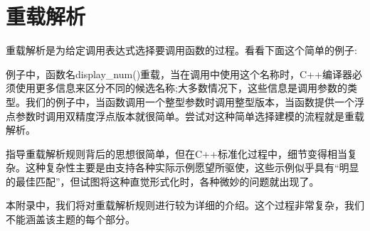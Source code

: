 \chapter{重载解析}
重载解析是为给定调用表达式选择要调用函数的过程。看看下面这个简单的例子:


例子中，函数名display\_num()重载，当在调用中使用这个名称时，C++编译器必须使用更多信息来区分不同的候选名称;大多数情况下，这些信息是调用参数的类型。我们的例子中，当函数调用一个整型参数时调用整型版本，当函数提供一个浮点参数时调用双精度浮点版本就很简单。尝试对这种简单选择建模的流程就是重载解析。

指导重载解析规则背后的思想很简单，但在C++标准化过程中，细节变得相当复杂。这种复杂性主要是由支持各种实际示例愿望所驱使，这些示例似乎具有“明显的最佳匹配”，但试图将这种直觉形式化时，各种微妙的问题就出现了。

本附录中，我们将对重载解析规则进行较为详细的介绍。这个过程非常复杂，我们不能涵盖该主题的每个部分。




























